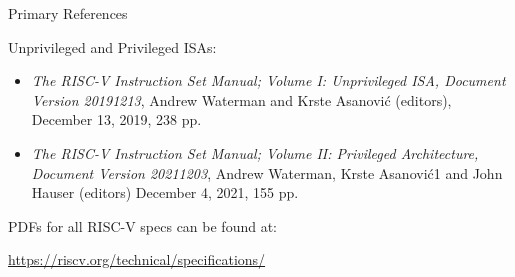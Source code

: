 \documentclass{article}
\begin{document}
\clearpage


\begin{center}\LARGE
  {\Huge Primary References}

  \vspace{0.5in}

  \begin{minipage}{9in}
    Unprivileged and Privileged ISAs:

    \begin{itemize}
    \item \emph{The RISC-V Instruction Set Manual; Volume I:
    Unprivileged ISA, Document Version 20191213}, Andrew Waterman and
      Krste Asanović (editors), December 13, 2019, 238 pp.

    \item \emph{The RISC-V Instruction Set Manual; Volume II: Privileged Architecture,
    Document Version 20211203}, Andrew Waterman, Krste Asanović1 and John Hauser (editors)
      December 4, 2021, 155 pp.
    \end{itemize}

    \vspace{1in}

    PDFs for all RISC-V specs can be found at:

    \vspace{2ex}

    \centering \url{https://riscv.org/technical/specifications/}

  \end{minipage}

\end{center}

\clearpage

\end{document}
